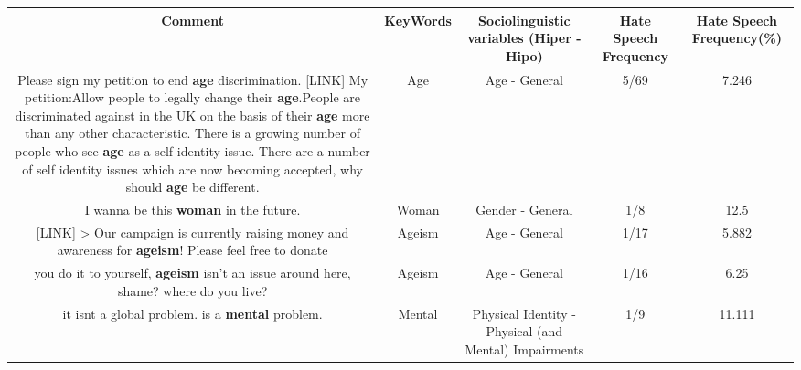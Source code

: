 \documentclass[11pt]{article}
\newlength\mylength
\begin{document}
\begin{center}
\setlength\mylength{\dimexpr\textwidth - 1\arrayrulewidth - 50\tabcolsep}
\begin{longtable}{|C{.65\mylength}|C{.30\mylength}|C{.12\mylength}|C{.12\mylength}|C{.12\mylength}|}
\hline
\textbf{Comment} & \textbf{KeyWords} & \textbf{Sociolinguistic variables (Hiper - Hipo)}  & \textbf{Hate Speech Frequency} & \textbf{Hate Speech Frequency(\%)} \\
\hline{}\small Please sign my petition to end \textbf{age} discrimination. [LINK] My petition:Allow people to legally change their \textbf{age}.People are discriminated against in the UK on the basis of their \textbf{age} more than any other characteristic. There is a growing number of people who see \textbf{age} as a self identity issue. There are a number of self identity issues which are now becoming accepted, why should \textbf{age} be different.\normalsize   & Age & Age - General & 5/69 & 7.246 \\  \hline
  \small I wanna be this \textbf{woman} in the future.\normalsize   & Woman & Gender - General & 1/8 & 12.5 \\  \hline
  \small  [LINK]   > Our campaign is currently raising money and awareness for \textbf{ageism}! Please feel free to donate\normalsize   & Ageism & Age - General & 1/17 & 5.882 \\  \hline
  \small you do it to yourself, \textbf{ageism} isn't an issue around here, shame? where do you live?\normalsize   & Ageism & Age - General & 1/16 & 6.25 \\  \hline
  \small it isnt a global problem. is a \textbf{mental} problem.\normalsize   & Mental & Physical Identity - Physical (and Mental) Impairments & 1/9 & 11.111 \\  \hline
  
\end{longtable}
\end{center}
\end{document}
